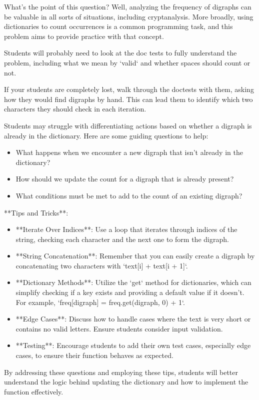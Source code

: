 \begin{questionmeta}
What's the point of this question? Well, analyzing the frequency of digraphs can be valuable in all sorts of situations, including cryptanalysis. More broadly, using dictionaries to count occurrences is a common programming task, and this problem aims to provide practice with that concept.

Students will probably need to look at the doc tests to fully understand the problem, including what we mean by `valid` and whether spaces should count or not. 

If your students are completely lost, walk through the doctests with them, asking how they would find digraphs by hand. This can lead them to identify which two characters they should check in each iteration.

Students may struggle with differentiating actions based on whether a digraph is already in the dictionary. Here are some guiding questions to help:
\begin{itemize}
    \item What happens when we encounter a new digraph that isn't already in the dictionary?
    \item How should we update the count for a digraph that is already present?
    \item What conditions must be met to add to the count of an existing digraph?
\end{itemize}

**Tips and Tricks**:
\begin{itemize}
    \item **Iterate Over Indices**: Use a loop that iterates through indices of the string, checking each character and the next one to form the digraph.
    \item **String Concatenation**: Remember that you can easily create a digraph by concatenating two characters with `text[i] + text[i + 1]`.
    \item **Dictionary Methods**: Utilize the `get` method for dictionaries, which can simplify checking if a key exists and providing a default value if it doesn't. For example, `freq[digraph] = freq.get(digraph, 0) + 1`.
    \item **Edge Cases**: Discuss how to handle cases where the text is very short or contains no valid letters. Ensure students consider input validation.
    \item **Testing**: Encourage students to add their own test cases, especially edge cases, to ensure their function behaves as expected.
\end{itemize}

By addressing these questions and employing these tips, students will better understand the logic behind updating the dictionary and how to implement the function effectively.
\end{questionmeta}
